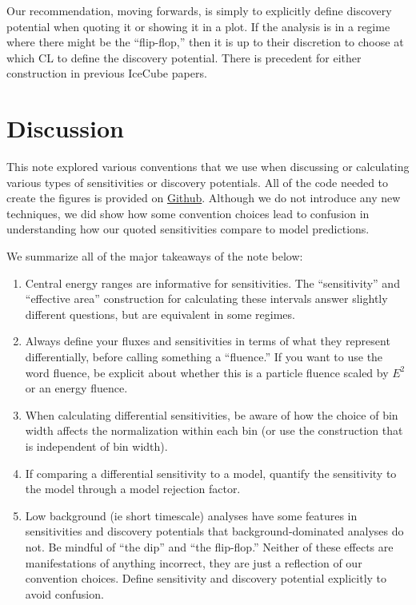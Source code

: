 \documentclass[a4paper,11pt]{article}
\begin{document}
Our recommendation, moving forwards, is simply to explicitly define discovery potential when quoting it or showing it in a plot. If the analysis is in a regime where there might be the ``flip-flop,'' then it is up to their discretion to choose at which CL to define the discovery potential. There is precedent for either construction in previous IceCube papers.


\section{Discussion}
This note explored various conventions that we use when discussing or calculating various types of sensitivities or discovery potentials. All of the code needed to create the figures is provided on \href{https://github.com/apizzuto/flux_conventions}{Github}. Although we do not introduce any new techniques, we did show how some convention choices lead to confusion in understanding how our quoted sensitivities compare to model predictions. 

We summarize all of the major takeaways of the note below:
\begin{enumerate}
    \item Central energy ranges are informative for  sensitivities. The ``sensitivity'' and ``effective area'' construction for calculating these intervals answer slightly different questions, but are equivalent in some regimes.
    \item \vspace{-6pt} Always define your fluxes and sensitivities in terms of what they represent differentially, before calling something a ``fluence.'' If you want to use the word fluence, be explicit about whether this is a particle fluence scaled by $E^2$ or an energy fluence.
    \item \vspace{-6pt} When calculating differential sensitivities, be aware of how the choice of bin width affects the normalization within each bin (or use the construction that is independent of bin width).
    \item \vspace{-6pt} If comparing a differential sensitivity to a model, quantify the sensitivity to the model through a model rejection factor.
    \item \vspace{-6pt} Low background (ie short timescale) analyses have some features in sensitivities and discovery potentials that background-dominated analyses do not. Be mindful of ``the dip'' and ``the flip-flop.'' Neither of these effects are manifestations of anything incorrect, they are just a reflection of our convention choices. Define sensitivity and discovery potential explicitly to avoid confusion.
\end{enumerate}



\end{document}
